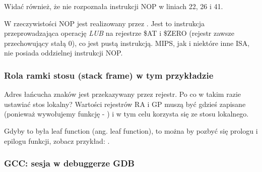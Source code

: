 Widać również, że \IDA nie rozpoznała instrukcji \ac{NOP} w liniach 22, 26 i 41.

W rzeczywistości \ac{NOP} jest realizowany przez .
Jest to instrukcja  przeprowadzająca operację \emph{LUB} na rejestrze \$AT i \$ZERO (rejestr zawsze przechowujący stałą 0),
co jest pustą instrukcją.
MIPS, jak i niektóre inne \ac{ISA}, nie posiada oddzielnej instrukcji \ac{NOP}.

\subsubsection{Rola ramki stosu (stack frame) w tym przykładzie}

Adres łańcucha znaków jest przekazywany przez rejestr.
Po co w takim razie ustawiać stos lokalny?
Wartości rejestrów \ac{RA} i GP muszą być gdzieś zapisane
(ponieważ wywołujemy funkcję - \printf) i w tym celu korzysta się ze stosu lokalnego.

Gdyby to była \gls{leaf function} (ang. leaf function), to można by pozbyć się prologu i epilogu funkcji, zobacz przykład:
 .

\subsubsection{\Optimizing GCC: sesja w debuggerze GDB}




